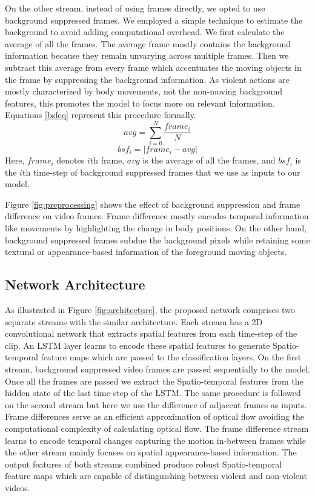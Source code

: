 \documentclass[conference]{IEEEtran}
\begin{document}
On the other stream, instead of using frames directly, we opted to use background suppressed frames. We employed a simple technique to estimate the background to avoid adding computational overhead. We first calculate the average of all the frames. The average frame mostly contains the background information because they remain unvarying across multiple frames. Then we subtract this average from every frame which accentuates the moving objects in the frame by suppressing the background information. As violent actions are mostly characterized by body movements, not the non-moving background features, this promotes the model to focus more on relevant information. Equations \ref{bsfeq} represent this procedure formally. 
\begin{equation}
avg = {\sum _{i=0}^N \frac{frame_i}{N}} \nonumber
\end{equation}
\begin{equation}\label{bsfeq}
bsf_i = | frame_i - avg |
\end{equation}
Here, \(frame_i\) denotes \(i\)th frame, \(avg\) is the average of all the frames, and \(bsf_i\) is the \(i\)th time-step of background suppressed frames that we use as inputs to our model. 

Figure \ref{fig:preprocessing} shows the effect of background suppression and frame difference on video frames. Frame difference mostly encodes temporal information like movements by highlighting the change in body positions. On the other hand, background suppressed frames subdue the background pixels while retaining some textural or appearance-based information of the foreground moving objects.




\subsection{Network Architecture}
As illustrated in Figure \ref{fig:architecture}, the proposed network comprises two separate streams with the similar architecture. Each stream has a 2D convolutional network that extracts spatial features from each time-step of the clip. An LSTM layer learns to encode these spatial features to generate Spatio-temporal feature maps which are passed to the classification layers. On the first stream, background suppressed video frames are passed sequentially to the model. Once all the frames are passed we extract the Spatio-temporal features from the hidden state of the last time-step of the LSTM. The same procedure is followed on the second stream but here we use the difference of adjacent frames as inputs. Frame differences serve as an efficient approximation of optical flow avoiding the computational complexity of calculating optical flow. The frame difference stream learns to encode temporal changes capturing the motion in-between frames while the other stream mainly focuses on spatial appearance-based information. The output features of both streams combined produce robust Spatio-temporal feature maps which are capable of distinguishing between violent and non-violent videos.
\end{document}

